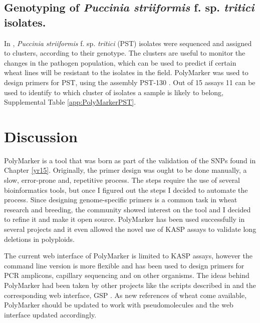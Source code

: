 \subsection{Genotyping of \textit{Puccinia 
striiformis} f. sp. \textit{tritici} isolates.}
In \cite{Hubbard2015}, \textit{Puccinia striiformis} f. sp. \textit{tritici} (PST) isolates were sequenced and assigned to clusters, according to their genotype.
The clusters are useful to monitor the changes in the pathogen population, which can be used to predict if certain wheat lines will be resistant to the isolates in the field. 
PolyMarker was used to design primers for PST, using the assembly PST-130 \citep{Cantu2011}.
Out of 15 assays 11 can be used to identify to which cluster of isolates a sample is likely to belong, Supplemental Table \ref{app:PolyMarkerPST}.


\section{Discussion}

PolyMarker is a tool that was born as part of the validation of the SNPs found in Chapter \ref{yr15}. 
Originally, the primer design was ought to be done manually, a slow, error-prone and, repetitive process. 
The steps require the use of several bioinformatics tools, but once I figured out the steps I decided to automate the process. 
Since designing genome-specific primers is a common task in wheat research and breeding, the community showed interest on the tool and I decided to refine it and make it open source. 
PolyMarker has been used successfully in several projects and it even allowed the novel use of KASP assays to validate long deletions in polyploids. 


The current web interface of PolyMarker is limited to KASP assays, however the command line version is more flexible and has been used to design primers for PCR amplicons, capillary sequencing and on other organisms. 
The ideas behind PolyMarker had been taken by other projects like the scripts described in \cite{Ma2015} and the corresponding web interface, GSP \citep{Wang2016}. 
As new references of wheat come available, PolyMarker should be updated to work with pseudomolecules and the web interface updated accordingly.  


 



